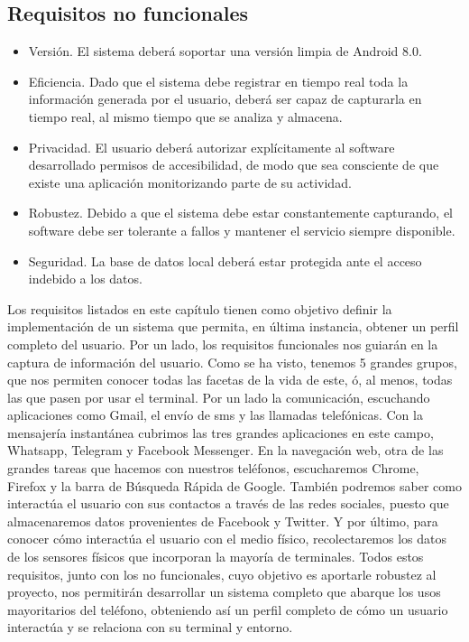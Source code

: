 \documentclass[12pt,a4paper,oneside]{book} %
\begin{document}
\subsection{Requisitos no funcionales}
\begin{itemize}
	\item Versión. El sistema deberá soportar una versión limpia de Android 8.0. 
	\item Eficiencia. Dado que el sistema debe registrar en tiempo real toda la información generada por el usuario, deberá ser capaz de capturarla en tiempo real, al mismo tiempo que se analiza y almacena. 
	\item Privacidad. El usuario deberá autorizar explícitamente al software desarrollado permisos de accesibilidad, de modo que sea consciente de que existe una aplicación monitorizando parte de su actividad.
	\item Robustez. Debido a que el sistema debe estar constantemente capturando, el software debe ser tolerante a fallos y mantener el servicio siempre disponible.  
	\item Seguridad. La base de datos local deberá estar protegida ante el acceso indebido a los datos. 
\end{itemize}
Los requisitos listados en este capítulo tienen como objetivo definir la implementación de un sistema que permita, en última instancia, obtener un perfil completo del usuario. 
\newline \newline 
Por un lado, los requisitos funcionales nos guiarán en la captura de información del usuario. Como se ha visto, tenemos 5 grandes grupos, que nos permiten conocer todas las facetas de la vida de este, ó, al menos, todas las que pasen por usar el terminal. 
\newline \newline
Por un lado la comunicación, escuchando aplicaciones como Gmail, el envío de sms y las llamadas telefónicas. Con la mensajería instantánea cubrimos las tres grandes aplicaciones en este campo, Whatsapp, Telegram y Facebook Messenger. En la navegación web, otra de las grandes tareas que hacemos con nuestros teléfonos, escucharemos Chrome, Firefox y la barra de Búsqueda Rápida de Google. 
\newline \newline 
También podremos saber como interactúa el usuario con sus contactos a través de las redes sociales, puesto que almacenaremos datos provenientes de Facebook y Twitter. Y por último, para conocer cómo interactúa el usuario con el medio físico, recolectaremos los datos de los sensores físicos que incorporan la mayoría de terminales. 
\newline \newline 
Todos estos requisitos, junto con los no funcionales, cuyo objetivo es aportarle robustez al proyecto, nos permitirán desarrollar un sistema completo que abarque los usos mayoritarios del teléfono, obteniendo así un perfil completo de cómo un usuario interactúa y se relaciona con su terminal y entorno. 
\break
\end{document}
